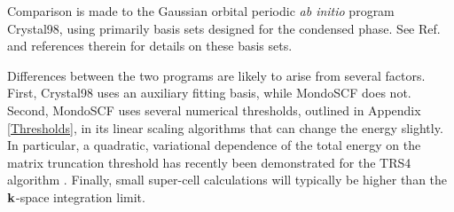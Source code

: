 \documentclass[prb,aps,nobibnotes,twocolumn,doublespace,twocolumngrid,superbib]{revtex4}
\begin{document}
Comparison is made to the Gaussian orbital periodic {\em ab initio} program {\sc Crystal98}, using
primarily basis sets designed for the condensed phase.  See Ref.~ and references 
therein for details on these basis sets. 


Differences between the two programs are likely to arise from several factors.  First, {\sc Crystal98}
 uses an auxiliary fitting basis, while {\sc MondoSCF} does not.  Second, {\sc MondoSCF} uses several 
numerical thresholds, outlined in Appendix \ref{Thresholds}, in its linear scaling algorithms that can 
change the energy slightly.   In particular, a quadratic, variational dependence of the total energy
on the  matrix truncation threshold has recently been demonstrated for the {\sc TRS4} algorithm 
\cite{ANiklasson03}.  Finally, small super-cell calculations will typically be higher than the 
${\bf k}$-space integration limit.  

\end{document}
